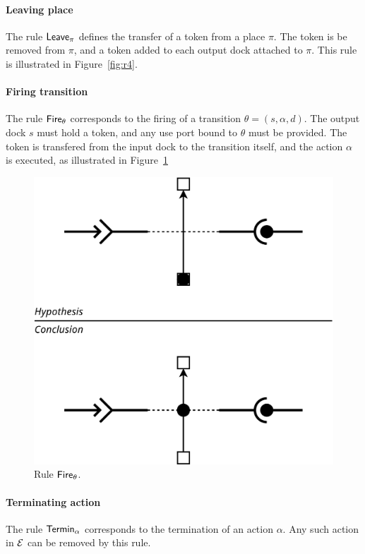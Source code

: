 {\begin{figure}[t]
\begin{minipage}[h]{0.45\columnwidth}
\end{minipage}
\end{figure}

\paragraph{Leaving place}{
  
The rule $\mathsf{Leave}_\pi$ defines the transfer of a token from a place
$\pi$. The token is be removed from $\pi$, and a token added to each
output dock attached to $\pi$. This rule is illustrated in
Figure~\ref{fig:r4}.

}

\paragraph{Firing transition}{

The rule $\mathsf{Fire}_\theta$ corresponds to the firing of a transition
$\theta = (s, \alpha, d)$. The output dock $s$ must hold a token, and
any use port bound to $\theta$ must be provided. The token is
transfered from the input dock to the transition itself, and the
action $\alpha$ is executed, as illustrated in Figure~\ref{fig:r1}

\begin{figure}[t]
\begin{center}
  \includegraphics[width=0.55\columnwidth]{./images/firing.pdf}
\end{center}
\caption{Rule $\mathsf{Fire}_\theta$.}
\label{fig:r1}
\end{figure}

}

\paragraph{Terminating action}{
  The rule $\mathsf{Termin}_\alpha$ corresponds to the termination of an action
  $\alpha$. Any such action in $\mathcal{E}$ can be removed by this rule.
}

}
